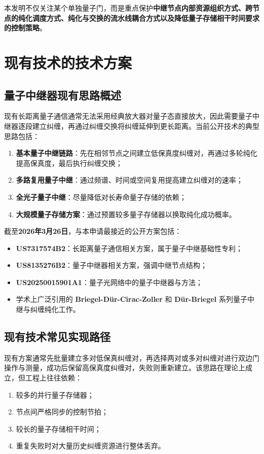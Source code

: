 \documentclass[12pt,a4paper]{article}
\begin{document}
本发明不仅关注某个单独量子门，而是重点保护\textbf{中继节点内部资源组织方式、跨节点的纯化调度方式、纯化与交换的流水线耦合方式以及降低量子存储相干时间要求的控制策略}。

\section{现有技术的技术方案}

\subsection{量子中继器现有思路概述}

现有长距离量子通信通常无法采用经典放大器对量子态直接放大，因此需要量子中继器逐段建立纠缠，再通过纠缠交换将纠缠延伸到更长距离。当前公开技术的典型思路包括：
\begin{enumerate}[label=(\arabic*)]
    \item \textbf{基本量子中继链路}：先在相邻节点之间建立低保真度纠缠对，再通过多轮纯化提高保真度，最后执行纠缠交换；
    \item \textbf{多路复用量子中继}：通过频谱、时间或空间复用提高建立纠缠对的速率；
    \item \textbf{全光子量子中继}：尽量降低对长寿命量子存储的依赖；
    \item \textbf{大规模量子存储方案}：通过预置较多量子存储器以换取纯化成功概率。
\end{enumerate}

截至\textbf{2026年3月26日}，与本申请最接近的公开方案包括：
\begin{itemize}[noitemsep]
    \item \textbf{US7317574B2}：长距离量子通信相关方案，属于量子中继基础性专利；
    \item \textbf{US8135276B2}：量子中继器相关方案，强调中继节点结构；
    \item \textbf{US20250015901A1}：量子光网络中的量子中继器与方法；
    \item 学术上广泛引用的 \textbf{Briegel-D\"ur-Cirac-Zoller} 和 \textbf{D\"ur-Briegel} 系列量子中继与纠缠纯化工作。
\end{itemize}

\subsection{现有技术常见实现路径}

现有方案通常先批量建立多对低保真纠缠对，再选择两对或多对纠缠对进行双边门操作与测量，成功后保留高保真度纠缠对，失败则重新建立。该思路在理论上成立，但工程上往往依赖：
\begin{enumerate}[label=(\arabic*)]
    \item 较多的并行量子存储器；
    \item 节点间严格同步的控制节拍；
    \item 较长的量子存储相干时间；
    \item 重复失败时对大量历史纠缠资源进行整体丢弃。
\end{enumerate}
\end{document}

